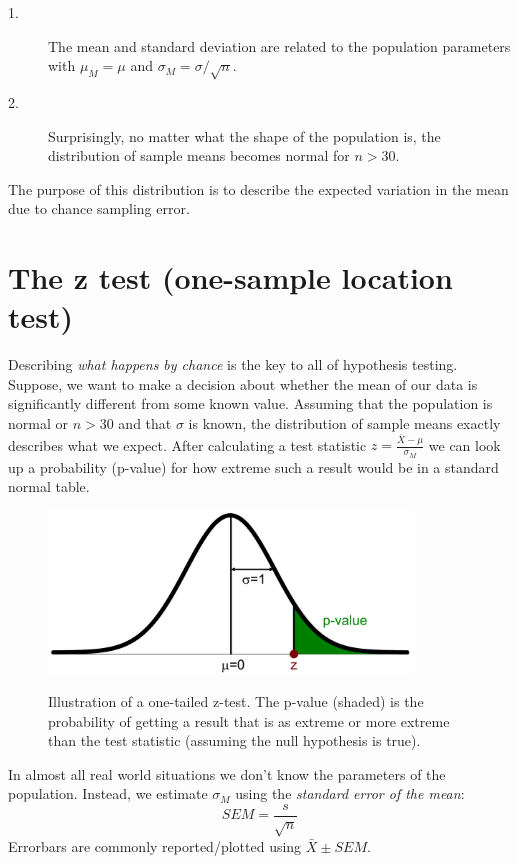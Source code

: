 \documentclass{tufte-handout}
\begin{document}
\begin{description}
\item[1.] The mean and standard deviation are related to the population parameters with $\mu_M = \mu$ and $\sigma_M=\sigma/\sqrt{n}$.
\item[2.] Surprisingly, no matter what the shape of the population is, the distribution of sample means becomes normal for $n > 30$.
\end{description}

The purpose of this distribution is to describe the expected variation in the mean due to chance sampling error.

\section{The z test (one-sample location test)}
Describing \emph{what happens by chance} is the key to all of hypothesis testing. Suppose, we want to make a decision about whether the mean of our data is significantly different from some known value. Assuming that the population is normal or $n > 30$ and that $\sigma$ is known, the distribution of sample means exactly describes what we expect. After calculating a test statistic $z=\frac{\bar{X}-\mu}{\sigma_M}$ we can look up a probability (p-value) for how extreme such a result would be in a standard normal table.
\begin{figure}
  \includegraphics[width=275pt]{images/handout2_ztest}%
  \label{fig:fullfig}%
  \caption{Illustration of a one-tailed z-test. The p-value (shaded) is the probability of getting a result that is as extreme or more extreme than the test statistic (assuming the null hypothesis is true).}
\end{figure}

In almost all real world situations we don't know the parameters of the population. Instead, we estimate $\sigma_M$ using the \emph{standard error of the mean}:
\begin{equation*}
SEM=\frac{s}{\sqrt{n}}
\end{equation*}					 
Errorbars are commonly reported/plotted using $\bar{X}\pm SEM$.
\end{document}
